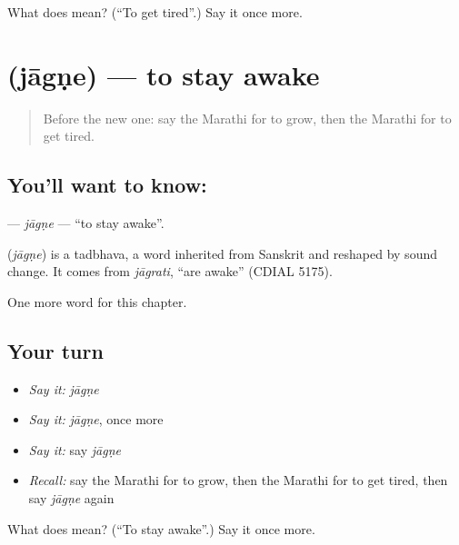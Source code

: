 \begin{tcolorbox}[breakable,colback=teal!4,colframe=teal!35!black,title={Before you move on}]
What does  mean? (\textquotedblleft{}To get tired\textquotedblright{}.) Say it once more.
\end{tcolorbox}
\section[\texorpdfstring{\mr{जागणे} (jāgṇe)}{जागणे (jāgṇe)}]{ (jāgṇe) — to stay awake}

\label{lesson:MR-C157-jagne}



\begin{quote}
Before the new one: say the Marathi for to grow, then the Marathi for to get tired.
\end{quote}

\subsection*{You'll want to know: }
\textbf{} — \emph{jāgṇe} — \textquotedblleft{}to stay awake\textquotedblright{}.

\begin{cousinweb}
\textbf{} (\emph{jāgṇe}) is a tadbhava, a word inherited from Sanskrit and reshaped by sound change. It comes from \emph{jāgrati}, \textquotedblleft{}are awake\textquotedblright{} (CDIAL 5175).
\end{cousinweb}

\begin{grammarlens}[title={What you've built}]
One more word for this chapter.
\end{grammarlens}

\subsection*{Your turn}
\begin{itemize}
\raggedright
  \item \emph{Say it:} \emph{jāgṇe}
  \item \emph{Say it:} \emph{jāgṇe}, once more
  \item \emph{Say it:} say \emph{jāgṇe}
  \item \emph{Recall:} say the Marathi for to grow, then the Marathi for to get tired, then say \emph{jāgṇe} again
\end{itemize}

\begin{tcolorbox}[breakable,colback=teal!4,colframe=teal!35!black,title={Before you move on}]
What does  mean? (\textquotedblleft{}To stay awake\textquotedblright{}.) Say it once more.
\end{tcolorbox}
